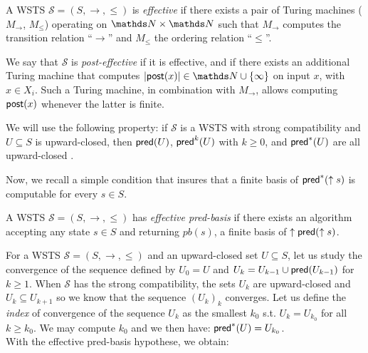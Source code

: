 A WSTS $\mathscr{S}=(S, \rightarrow, \leq)$ is {\em effective} if there exists a pair of Turing machines
($M_\rightarrow$, $M_\leq$) operating on $\N \times \N$ such that
$ M_\rightarrow$ computes the transition relation “$\rightarrow$” and 
$M_\leq$ the ordering relation “$\leq$”.

We say that $\mathscr{S}$ is {\em post-effective} if it is effective, and if there
exists an additional Turing machine that computes $|\post(x)| \in \N \cup \{\infty\}$ 
on input $x$, with $x \in X_i $. 
Such a Turing machine, in combination with $M_\rightarrow$, allows computing
$\textsf{post}(x)$ whenever the latter is finite. 

We will use the following property: if $\mathscr{S}$ is a WSTS with strong compatibility and $U \subseteq S$ is upward-closed, then $\textsf{pred}(U )$, $\textsf{pred}^k(U )$ with $k\geq0$, and $\textsf{pred}^*(U )$ are all upward-closed \cite{DBLP:journals/tcs/FinkelS01}.

\iffalse
Proof. Assume $s \in \pred (I )$. Then $s \rightarrow t$ for some $t \in I $. If now $s' \geq s$ then strong upward-compatibility entails that $s' \rightarrow t'$ for some $t' \geq t$. Then $t' \in I$ and $s' \in \pred(I )$.
\fi
%

Now, we recall a simple condition that insures that a finite basis of $\textsf{pred}^*(\uparrow s )$ is computable for every $s \in S$.

\begin{definition}\cite{DBLP:journals/tcs/FinkelS01,DBLP:journals/iandc/AbdullaCJT00}
A WSTS $\mathscr{S}=(S, \rightarrow, \leq)$ has {\em effective pred-basis} if there exists an algorithm accepting
any state $s \in S$ and returning $pb(s)$, a finite basis of $\uparrow \textsf{pred}(\uparrow s)$.
\end{definition}

For a WSTS $\mathscr{S}=(S, \rightarrow, \leq)$ and an upward-closed set $U  \subseteq S$, let us study the convergence of the sequence defined by $U_0=U$ and $U_k= U_{k-1} \cup \textsf{pred}(U_{k-1})$ for $k \geq 1$. When $\mathscr{S}$ has the strong compatibility, the sets $U_k$ are upward-closed and $U_k \subseteq U_{k+1}$ so we know that the sequence $(U_k)_k$ converges. Let us define the \emph{index} of convergence of the sequence $U_k$ as the smallest $k_0$ s.t. $U_k = U_{k_0}$ for all $k \geq k_0$. We may compute $k_0$ and we then have:  $\textsf{pred}^*(U) = U_{k_0}$. \\

With the effective pred-basis hypothese, we obtain:

